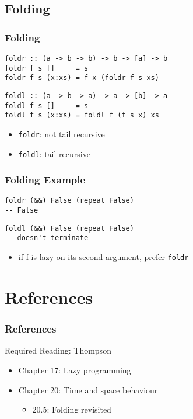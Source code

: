\documentclass[dvipsnames]{beamer}
\theoremstyle{plain}
\begin{document}
\lstset{language=Haskell}

\subsection{Folding}

\begin{frame}[fragile]
  \frametitle{Folding}

  \begin{lstlisting}
foldr :: (a -> b -> b) -> b -> [a] -> b
foldr f s []     = s
foldr f s (x:xs) = f x (foldr f s xs)
    \end{lstlisting}

    \begin{lstlisting}
foldl :: (a -> b -> a) -> a -> [b] -> a
foldl f s []     = s
foldl f s (x:xs) = foldl f (f s x) xs
  \end{lstlisting}

  \medskip
  \begin{itemize}
    \item \lstinline|foldr|: not tail recursive
    \item \lstinline|foldl|: tail recursive
  \end{itemize}
\end{frame}

\begin{frame}[fragile]
  \frametitle{Folding Example}

  \begin{lstlisting}
foldr (&&) False (repeat False)
-- False
  \end{lstlisting}

  \pause
  \begin{lstlisting}
foldl (&&) False (repeat False)
-- doesn't terminate
  \end{lstlisting}

  \pause
  \medskip
  \begin{itemize}
    \item if f is lazy on its second argument, prefer \lstinline|foldr|
  \end{itemize}
\end{frame}

\section*{References}

\begin{frame}
  \frametitle{References}

  \begin{block}{Required Reading: Thompson}
    \begin{itemize}
      \item Chapter 17: \alert{Lazy programming}
      \item Chapter 20: Time and space behaviour
      \begin{itemize}
        \item 20.5: \alert{Folding revisited}
      \end{itemize}
    \end{itemize}
  \end{block}
\end{frame}
\end{document}
